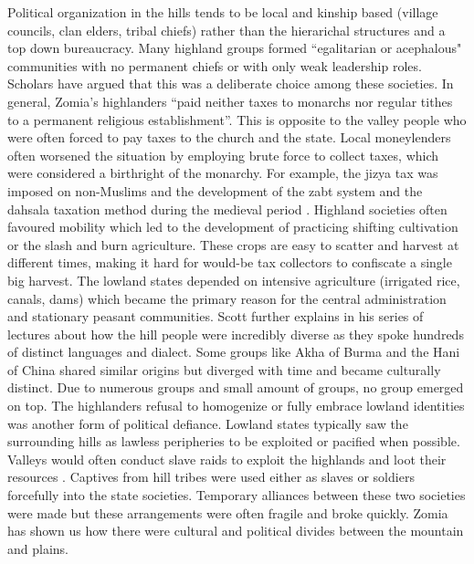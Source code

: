 Political organization in the hills tends to be local and kinship based (village councils, clan elders, tribal chiefs) rather than the hierarichal structures and a top down bureaucracy. Many highland groups formed ``egalitarian or acephalous" communities with no permanent chiefs or with only weak leadership roles. Scholars have argued that this was a deliberate choice among these societies. In general, Zomia’s highlanders ``paid neither taxes to monarchs nor regular tithes to a permanent religious establishment”. This is opposite to the valley people who were often forced to pay taxes to the church and the state. Local moneylenders often worsened the situation by employing brute force to collect taxes, which were considered a birthright of the monarchy. For example, the jizya tax was imposed on non-Muslims and the development of the zabt system and the dahsala taxation method during the medieval period \citep{moosvi1973production}. Highland societies often favoured mobility which led to the development of practicing shifting cultivation or the slash and burn agriculture. These crops are easy to scatter and harvest at different times, making it hard for would-be tax collectors to confiscate a single big harvest. The lowland states depended on intensive agriculture (irrigated rice, canals, dams) which became the primary reason for the central administration and stationary peasant communities. Scott further explains in his series of lectures  \citep{scott2005civilizations} about how the hill people were incredibly diverse as they spoke hundreds of distinct languages and dialect. Some groups like Akha of Burma and the Hani of China shared similar origins \citep{boonyasaranai2014common} but diverged with time and became culturally distinct. Due to numerous groups and small amount of groups, no group emerged on top. The highlanders refusal to homogenize or fully embrace lowland identities was another form of political defiance. Lowland states typically saw the surrounding hills as lawless peripheries to be exploited or pacified when possible. Valleys would often conduct slave raids to exploit the highlands and loot their resources \citep{walker1999legend}. Captives from hill tribes were used either as slaves or soldiers forcefully into the state societies. Temporary alliances between these two societies were made  but these arrangements were often fragile and broke quickly. Zomia has shown us how there were cultural and political divides between the mountain and plains.

